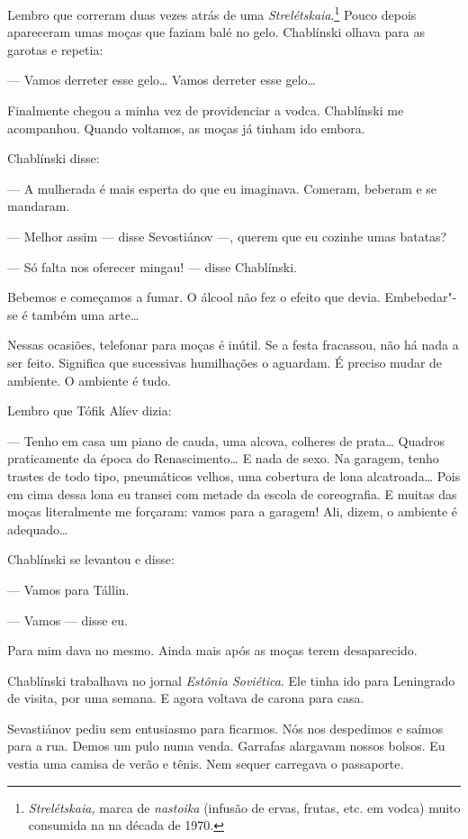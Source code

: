 Lembro que correram duas vezes atrás de uma
\emph{Strelétskaia}.\footnote{\emph{Strelétskaia,} marca de
  \emph{nastoika} (infusão de ervas, frutas, etc. em vodca) muito
  consumida na  na década de 1970.} Pouco depois apareceram umas
moças que faziam balé no gelo. Chablínski olhava para as garotas e
repetia:

--- Vamos derreter esse gelo\ldots{} Vamos derreter esse gelo\ldots{}

Finalmente chegou a minha vez de providenciar a vodca. Chablínski me
acompanhou. Quando voltamos, as moças já tinham ido embora.

Chablínski disse:

--- A mulherada é mais esperta do que eu imaginava. Comeram, beberam e
se mandaram.

--- Melhor assim --- disse Sevostiánov ---, querem que eu cozinhe umas
batatas?

--- Só falta nos oferecer mingau! --- disse Chablínski.

Bebemos e começamos a fumar. O álcool não fez o efeito que devia.
Embebedar"-se é também uma arte\ldots{}

Nessas ocasiões, telefonar para moças é inútil. Se a festa fracassou,
não há nada a ser feito. Significa que sucessivas humilhações o
aguardam. É preciso mudar de ambiente. O ambiente é tudo.

Lembro que Tófik Alíev dizia:

--- Tenho em casa um piano de cauda, uma alcova, colheres de prata\ldots{}
Quadros praticamente da época do Renascimento\ldots{} E nada de sexo. Na
garagem, tenho trastes de todo tipo, pneumáticos velhos, uma cobertura
de lona alcatroada\ldots{} Pois em cima dessa lona eu transei com metade da
escola de coreografia. E muitas das moças literalmente me forçaram:
vamos para a garagem! Ali, dizem, o ambiente é adequado\ldots{}

Chablínski se levantou e disse:

--- Vamos para Tállin.

--- Vamos --- disse eu.

Para mim dava no mesmo. Ainda mais após as moças terem desaparecido.

Chablínski trabalhava no jornal \emph{Estônia Soviética}. Ele tinha ido
para Leningrado de visita, por uma semana. E agora voltava de carona
para casa.

Sevastiánov pediu sem entusiasmo para ficarmos. Nós nos despedimos e
saímos para a rua. Demos um pulo numa venda. Garrafas alargavam nossos \label{ref3}
bolsos. Eu vestia uma camisa de verão e tênis. Nem sequer carregava o
passaporte.

